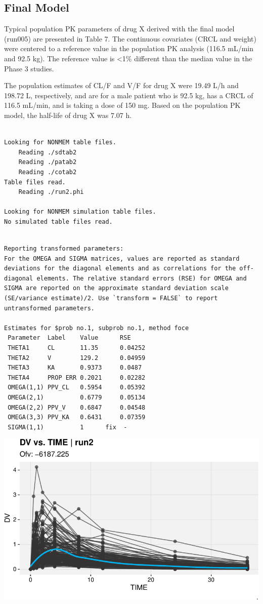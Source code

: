 \documentclass[
  letterpaper,
  toc=chapterentrywithdots,
  11pt,
  headings=small]{scrreprt}
\begin{document}
\subsection{Final Model}\label{final-model}

Typical population PK parameters of drug X derived with the final model
(run005) are presented in Table 7. The continuous covariates (CRCL and
weight) were centered to a reference value in the population PK analysis
(116.5 mL/min and 92.5 kg). The reference value is \textless1\%
different than the median value in the Phase 3 studies.

The population estimates of CL/F and V/F for drug X were 19.49 L/h and
198.72 L, respectively, and are for a male patient who is 92.5 kg, has a
CRCL of 116.5 mL/min, and is taking a dose of 150 mg. Based on the
population PK model, the half-life of drug X was 7.07 h.

\begin{verbatim}

Looking for NONMEM table files.
    Reading ./sdtab2 
    Reading ./patab2 
    Reading ./cotab2 
Table files read.
    Reading ./run2.phi 

Looking for NONMEM simulation table files.
No simulated table files read.
\end{verbatim}

\begin{verbatim}

Reporting transformed parameters:
For the OMEGA and SIGMA matrices, values are reported as standard deviations for the diagonal elements and as correlations for the off-diagonal elements. The relative standard errors (RSE) for OMEGA and SIGMA are reported on the approximate standard deviation scale (SE/variance estimate)/2. Use `transform = FALSE` to report untransformed parameters.

Estimates for $prob no.1, subprob no.1, method foce
 Parameter  Label    Value      RSE
 THETA1     CL       11.35      0.04252
 THETA2     V        129.2      0.04959
 THETA3     KA       0.9373     0.0487
 THETA4     PROP ERR 0.2021     0.02282
 OMEGA(1,1) PPV_CL   0.5954     0.05392
 OMEGA(2,1)          0.6779     0.05134
 OMEGA(2,2) PPV_V    0.6847     0.04548
 OMEGA(3,3) PPV_KA   0.6431     0.07359
 SIGMA(1,1)          1      fix  - 
\end{verbatim}

\includegraphics{sec/results_files/figure-pdf/unnamed-chunk-4-1.pdf}
\end{document}

